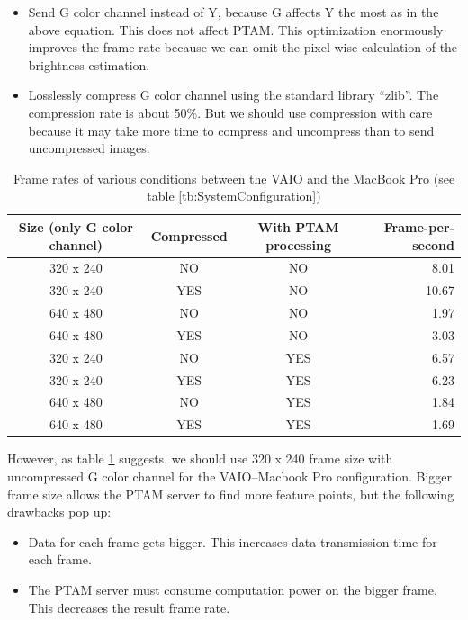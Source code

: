 \begin{itemize}
	\item Send G color channel instead of Y, because G affects Y the most as in the above equation. This does not affect PTAM. This optimization enormously improves the frame rate because we can omit the pixel-wise calculation of the brightness estimation.
	\item Losslessly compress G color channel using the standard library ``zlib''. The compression rate is about 50\%. But we should use compression with care because it may take more time to compress and uncompress than to send uncompressed images.
\end{itemize}

\begin{table}[tb]
	\begin{center}
		\caption{Frame rates of various conditions between the VAIO and the MacBook Pro (see table \ref{tb:SystemConfiguration})}
		\label{tb:FrameRates}
		\begin{tabular}{|c|c|c|r|}
			\hline
			Size (only G color channel) & Compressed & With PTAM processing & Frame-per-second \\
			\hline
			320 x 240 & NO         & NO                   &  8.01 \\
			320 x 240 & YES        & NO                   & 10.67 \\
			640 x 480 & NO         & NO                   &  1.97 \\
			640 x 480 & YES        & NO                   &  3.03 \\
			320 x 240 & NO         & YES                  &  6.57 \\
			320 x 240 & YES        & YES                  &  6.23 \\
			640 x 480 & NO         & YES                  &  1.84 \\
			640 x 480 & YES        & YES                  &  1.69 \\
			\hline
		\end{tabular}
	\end{center}
\end{table}

However, as table \ref{tb:FrameRates} suggests, we should use 320 x 240 frame size with uncompressed G color channel for the VAIO--Macbook Pro configuration. Bigger frame size allows the PTAM server to find more feature points, but the following drawbacks pop up:

\begin{itemize}
	\item Data for each frame gets bigger. This increases data transmission time for each frame.
	\item The PTAM server must consume computation power on the bigger frame. This decreases the result frame rate.
\end{itemize}

